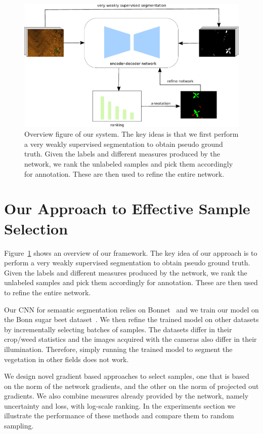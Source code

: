 \documentclass[letterpaper, 10 pt, conference]{ieeeconf}  %
\begin{document}
    \begin{figure}
    \centering
    \includegraphics[width=\linewidth]{pics/output_system_overview.pdf}
      \caption{Overview figure of our system. The key ideas is that we first perform a very weakly supervised segmentation to obtain pseudo ground truth. Given the labels and different measures produced by the network, we rank the unlabeled samples and pick them accordingly for annotation. These are then used to refine the entire network.}
    \label{fig:overview}        
   \end{figure}


\section{Our Approach to Effective Sample Selection}
\label{sec:approach}

Figure~\ref{fig:overview} shows an overview of our framework.
The key idea of our approach is to perform a very weakly supervised segmentation to obtain pseudo ground truth. Given the labels and different measures produced by the network, we rank the unlabeled samples and pick them accordingly for annotation. These are then used to refine the entire network.

Our CNN for semantic segmentation relies on Bonnet~\cite{milioto2018bonnet} and we train our model on the Bonn sugar beet dataset~\cite{chebrolu2017agricultural}. We then refine the trained model on other datasets by incrementally selecting batches of samples. The datasets differ in their crop/weed statistics and the images acquired with the cameras also differ in their illumination. Therefore, simply running the trained model to segment the vegetation in other fields does not work.

We design novel gradient based approaches to select samples, one that is based on the norm of the network gradients, and the other on the norm of projected out gradients. We also combine measures already provided by the network, namely uncertainty and loss, with log-scale ranking. In the experiments section we illustrate the performance of these methods and compare them to random sampling.
\end{document}
